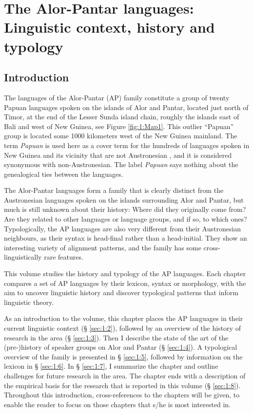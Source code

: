 \chapter{The Alor-Pantar languages:  Linguistic context, history and typology}


\section{Introduction}\label{sec:1:1}
The languages of the Alor-Pantar (AP) family constitute a group of twenty Papuan languages spoken on the islands of Alor and Pantar, located just north of Timor, at the end of the Lesser Sunda island chain, roughly the islands east of Bali and west of New Guinea, see Figure \ref{fig:1:Map1}. This outlier ``Papuan'' group is located some 1000 kilometers west of the New Guinea mainland. The term \textit{Papuan} is used here as a cover term for the hundreds of languages spoken in New Guinea and its vicinity that are not Austronesian \citep[15]{Ross2005}, and it is considered synonymous with non-Austronesian. The label \textit{Papuan} says nothing about the genealogical ties between the languages. 

The Alor-Pantar languages form a family that is clearly distinct from the Austronesian languages spoken on the islands surrounding Alor and Pantar, but much is still unknown about their history: Where did they originally come from? Are they related to other languages or language groups, and if so, to which ones? Typologically, the AP languages are also very different from their Austronesian neighbours, as their syntax is head-final rather than a head-initial. They show an interesting variety of alignment patterns, and the family has some cross-linguistically rare features.  

This volume studies the history and typology of the AP languages. Each chapter compares a set of AP languages by their lexicon, syntax or morphology, with the aim to uncover linguistic history and discover typological patterns that inform linguistic theory. 

As an introduction to the volume, this chapter places the AP languages in their current linguistic context ({\S{}} \ref{sec:1:2}), followed by an overview of the history of research in the area ({\S{}} \ref{sec:1:3}). Then I describe the state of the art of the (pre-)history of speaker groups on Alor and Pantar ({\S{}} \ref{sec:1:4}). A typological overview of the family is presented in {\S{}} \ref{sec:1:5}, followed by information on the lexicon in {\S{}} \ref{sec:1:6}. In {\S{}} \ref{sec:1:7}, I summarize the chapter and outline challenges for future research in the area. The chapter ends with a description of the empirical basis for the research that is reported in this volume ({\S{}} \ref{sec:1:8}). Throughout this introduction, cross-references to the chapters will be given, to enable the reader to focus on those chapters that s/he is most interested in. 


